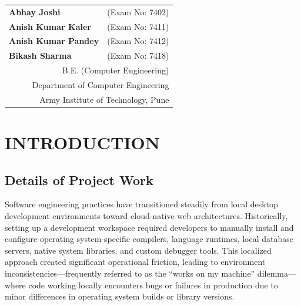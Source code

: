 \documentclass[12pt,a4paper]{report}
\begin{document}
\vfill
\begin{flushright}
\begin{tabular}{ll}
    \textbf{Abhay Joshi} & (Exam No: 7402) \\
    \textbf{Anish Kumar Kaler} & (Exam No: 7411) \\
    \textbf{Anish Kumar Pandey} & (Exam No: 7412) \\
    \textbf{Bikash Sharma} & (Exam No: 7418) \\[0.2cm]
    \multicolumn{2}{r}{\small B.E. (Computer Engineering)} \\
    \multicolumn{2}{r}{\small Department of Computer Engineering} \\
    \multicolumn{2}{r}{\small Army Institute of Technology, Pune}
\end{tabular}
\end{flushright}
\vspace{0.5cm}

\clearpage
\tableofcontents

\clearpage
{}
\listoffigures

\clearpage
{}
\listoftables

\clearpage
{}
\setcounter{page}{1}

\chapter{INTRODUCTION}

\section{Details of Project Work}
Software engineering practices have transitioned steadily from local desktop development environments toward cloud-native web architectures. Historically, setting up a development workspace required developers to manually install and configure operating system-specific compilers, language runtimes, local database servers, native system libraries, and custom debugger tools. This localized approach created significant operational friction, leading to environment inconsistencies---frequently referred to as the ``works on my machine'' dilemma---where code working locally encounters bugs or failures in production due to minor differences in operating system builds or library versions.
\end{document}
